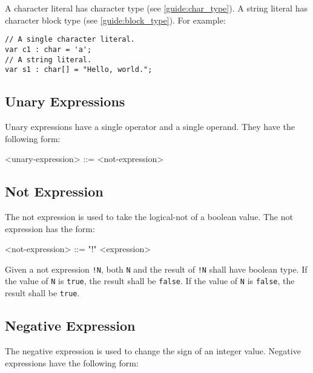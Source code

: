 A character literal has character type (see \ref{guide:char_type}). A string literal has character block type (see \ref{guide:block_type}).
For example:

\begin{minip}
\begin{lstlisting}
// A single character literal.
var c1 : char = 'a';
// A string literal.
var s1 : char[] = "Hello, world."; 
\end{lstlisting}
\end{minip}

\subsection{Unary Expressions} \label{guide:unary_expr}

Unary expressions have a single operator and a single operand. They have the following form:

\begin{minip}
\begin{grammar}
<unary-expression> ::= 
<not-expression>
\end{grammar}
\end{minip}

\subsection{Not Expression} \label{guide:not_expr}

The not expression is used to take the logical-not of a boolean value. The not expression has the form: 

\begin{minip}
\begin{grammar}
<not-expression> ::= "!" <expression> 
\end{grammar}
\end{minip}

Given a not expression \texttt{!N}, both \texttt{N} and the result of \texttt{!N} shall have boolean type. If the value of \texttt{N} is \texttt{true}, the result shall be \texttt{false}. If the value of \texttt{N} is \texttt{false}, the result shall be \texttt{true}.

\subsection{Negative Expression} \label{neg_expr_guide}

The negative expression is used to change the sign of an integer value. Negative expressions have the following form:

